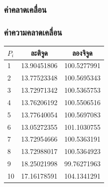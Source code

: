 \documentclass[12pt,aspectratio=169]{beamer}
\begin{document}
\begin{frame}
    \frametitle{ค่าคลาดเคลื่อน}

    \end{frame}

\begin{frame}
    \frametitle{ค่าความคลาดเคลื่อน}
\begin{center}
    \begin{tabular}{lcc} 
        \hline
        $P_i$ & ละติจูด & ลองจิจูด \\
        \hline
        1 & 13.90451806 & 100.5277991   \\
        2 & 13.77523348 & 100.5695343  \\
        3 & 13.72971342 & 100.5365753 \\
        4 & 13.76206192 & 100.5506516  \\
        5 & 13.77640054 & 100.5697083\\
        6 & 13.05272355 & 101.1030755\\
        7 & 13.72954666 & 100.5363191 \\
        8 & 13.72988017 & 100.5364923 \\
        9 & 18.25021998 & 99.76271963\\
        10 & 17.16178591 & 104.1341291 \\
        \hline
        \end{tabular}
    \end{center}
\end{frame}
\end{document}
